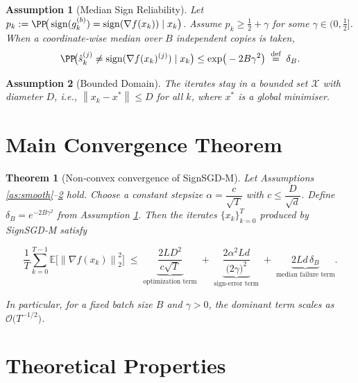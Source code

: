 \documentclass{article}
\newtheorem{theorem}{Theorem}
\newtheorem{assumption}{Assumption}
\newcommand{\sign}{\operatorname{sign}}
\newcommand{\EE}{\mathbb{E}}
\newcommand{\norm}[1]{\left\|#1\right\|}
\newcommand{\grad}{\nabla}
\begin{document}
\begin{assumption}[Median Sign Reliability]\label{as:median}
Let $p_{k}:=\PP\!\big(\sign(g_{k}^{(b)})=\sign(\grad f(x_{k}))\mid x_{k}\big)$.  
Assume $p_{k}\ge \tfrac12+\gamma$ for some $\gamma\in(0,\tfrac12]$.  
When a coordinate‑wise median over $B$ independent copies is taken,
\[
\PP\!\big(\hat{s}_{k}^{(j)}\neq\sign(\grad f(x_{k})^{(j)})\mid x_{k}\big)
\le \exp\!\big(-2B\gamma^{2}\big)\;\stackrel{\text{def}}{=}\;\delta_{B}.
\]
\end{assumption}

\begin{assumption}[Bounded Domain]\label{as:bounded}
The iterates stay in a bounded set $\mathcal{X}$ with diameter $D$,
i.e., $\norm{x_{k}-x^{*}}\le D$ for all $k$, where $x^{*}$ is a global minimiser.
\end{assumption}

\section*{Main Convergence Theorem}

\begin{theorem}[Non‑convex convergence of SignSGD‑M]\label{thm:main}
Let Assumptions \ref{as:smooth}–\ref{as:bounded} hold.
Choose a constant stepsize $\alpha=\dfrac{c}{\sqrt{T}}$ with $c\le \dfrac{D}{\sqrt{d}}$.
Define $\delta_{B}=e^{-2B\gamma^{2}}$ from Assumption \ref{as:median}.
Then the iterates $\{x_{k}\}_{k=0}^{T}$ produced by SignSGD‑M satisfy  

\[
\frac{1}{T}\sum_{k=0}^{T-1}\EE\!\big[\norm{\grad f(x_{k})}_{2}^{2}\big]
\;\le\;
\underbrace{\frac{2L D^{2}}{c\sqrt{T}}}_{\text{optimization term}}
\;+\;
\underbrace{\frac{2\alpha^{2}L d}{\big(2\gamma\big)^{2}}}_{\text{sign‑error term}}
\;+\;
\underbrace{2L d\,\delta_{B}}_{\text{median failure term}} .
\]

In particular, for a fixed batch size $B$ and $\gamma>0$, the dominant term scales as
$\mathcal{O}\!\big(T^{-1/2}\big)$.
\end{theorem}

\section*{Theoretical Properties}
\end{document}
